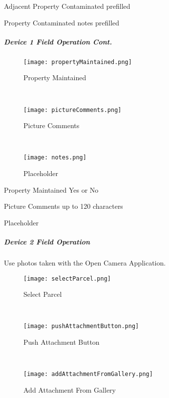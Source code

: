 \documentclass[class=book , crop=false, titlepage, twoside, multi={itemize, figure, verbatim}, float=false]{standalone}
\begin{document}
\noindent Adjacent Property Contaminated prefilled
\vspace{2in}

\noindent Property Contaminated notes prefilled
\clearpage
%
%
%
\subparagraph*{Device 1 Field Operation Cont.}
%
%
\begin{wrapfigure}{r}{0.4\textwidth}
\centering
\texttt{[image: propertyMaintained.png]}
\caption {Property Maintained}
\vspace{.1in}

\HRule \\[.4cm] %
\vspace{.1in}

\texttt{[image: pictureComments.png]}
\caption{Picture Comments}
\vspace{.1in}

\HRule \\[.4cm] %
\vspace{.1in}

\texttt{[image: notes.png]}
\caption{Placeholder}
\end{wrapfigure}
Property Maintained Yes or No
\vspace{2.5in}

\noindent Picture Comments up to 120 characters
\vspace{2.5in}

\noindent Placeholder
\clearpage
%
%
%
\subparagraph[Device 2 Field Operation]{Device 2 Field Operation\texorpdfstring{\\}{}}

Use photos taken with the Open Camera Application.
%
%
\begin{wrapfigure}{r}{0.4\textwidth}
\centering
\texttt{[image: selectParcel.png]}
\caption {Select Parcel}
\vspace{.1in}

\HRule \\[.4cm] %

\vspace{.1in}

\texttt{[image: pushAttachmentButton.png]}
\caption{Push Attachment Button}

\vspace{.1in}

\HRule \\[.4cm] %

\vspace{.1in}

\texttt{[image: addAttachmentFromGallery.png]}
\caption{Add Attachment From Gallery}
\end{wrapfigure}
\end{document}
